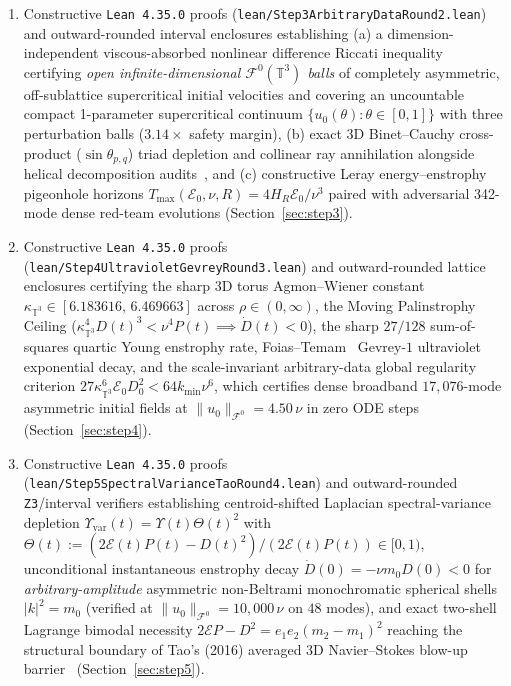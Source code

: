 \documentclass[11pt]{article}
\theoremstyle{plain}
\theoremstyle{definition}
\begin{document}
\begin{itemize}
\begin{enumerate}
      \item Constructive \texttt{Lean 4.35.0} proofs (\texttt{lean/Step3ArbitraryDataRound2.lean}) and outward-rounded interval enclosures establishing (a) a dimension-independent viscous-absorbed nonlinear difference Riccati inequality certifying \emph{open infinite-dimensional $\mathcal{F}^0(\mathbb{T}^3)$ balls} of completely asymmetric, off-sublattice supercritical initial velocities and covering an uncountable compact 1-parameter supercritical continuum $\{u_0(\theta) : \theta \in [0,1]\}$ with three perturbation balls ($3.14\times$ safety margin), (b) exact 3D Binet--Cauchy cross-product ($\sin\theta_{p,q}$) triad depletion and collinear ray annihilation alongside helical decomposition audits~\cite{constantinmajda1988,waleffe1992,biferale2012}, and (c) constructive Leray energy--enstrophy pigeonhole horizons $T_{\max}(\mathcal{E}_0,\nu,R) = 4 H_R \mathcal{E}_0 / \nu^3$ paired with adversarial 342-mode dense red-team evolutions (Section~\ref{sec:step3}).
      \item Constructive \texttt{Lean 4.35.0} proofs (\texttt{lean/Step4UltravioletGevreyRound3.lean}) and outward-rounded lattice enclosures certifying the sharp 3D torus Agmon--Wiener constant $\kappa_{\mathbb{T}^3} \in [6.183616, \, 6.469663]$ across $\rho \in (0,\infty)$, the Moving Palinstrophy Ceiling ($\kappa_{\mathbb{T}^3}^4 D(t)^3 < \nu^4 P(t) \implies \dot{D}(t) < 0$), the sharp $27/128$ sum-of-squares quartic Young enstrophy rate, Foias--Temam~\cite{foiastemam1989,doeringtiti1995} Gevrey-$1$ ultraviolet exponential decay, and the scale-invariant arbitrary-data global regularity criterion $27 \kappa_{\mathbb{T}^3}^6 \mathcal{E}_0 D_0^2 < 64 k_{\min} \nu^6$, which certifies dense broadband $17{,}076$-mode asymmetric initial fields at $\|u_0\|_{\mathcal{F}^0} = 4.50\,\nu$ in zero ODE steps (Section~\ref{sec:step4}).
      \item Constructive \texttt{Lean 4.35.0} proofs (\texttt{lean/Step5SpectralVarianceTaoRound4.lean}) and outward-rounded \texttt{Z3}/interval verifiers establishing centroid-shifted Laplacian spectral-variance depletion $\Upsilon_{\mathrm{var}}(t) = \Upsilon(t)\Theta(t)^2$ with $\Theta(t) := (2\mathcal{E}(t)P(t) - D(t)^2)/(2\mathcal{E}(t)P(t)) \in [0,1)$, unconditional instantaneous enstrophy decay $\dot{D}(0) = -\nu m_0 D(0) < 0$ for \emph{arbitrary-amplitude} asymmetric non-Beltrami monochromatic spherical shells $|k|^2 = m_0$ (verified at $\|u_0\|_{\mathcal{F}^0} = 10{,}000\,\nu$ on $48$ modes), and exact two-shell Lagrange bimodal necessity $2\mathcal{E}P - D^2 = e_1 e_2 (m_2 - m_1)^2$ reaching the structural boundary of Tao's (2016) averaged 3D Navier--Stokes blow-up barrier~\cite{tao2016} (Section~\ref{sec:step5}).

\end{enumerate}
\end{itemize}
\end{document}
